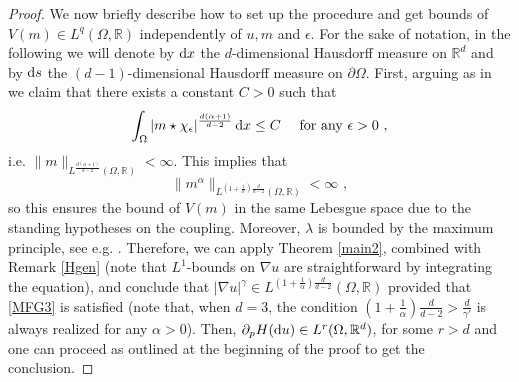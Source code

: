 \documentclass[10pt, a4paper, reqno, oneside]{amsart}
\theoremstyle{plain}
\theoremstyle{definition}
\theoremstyle{plain}
\theoremstyle{definition}
\theoremstyle{plain}
\renewcommand{\=}{:=}
\begin{document}
\begin{proof}
We now briefly describe how to set up the procedure and get bounds of $V(m)\in L^q(\Omega,\mathbb{R})$ independently of $u,m$ and $\epsilon$. For the sake of notation, in the following we will denote by ${\rm d}x$ the $d$-dimensional Hausdorff measure on $\mathbb{R}^d$ and by ${\rm d}s$ the $(d{-}1)$-dimensional Hausdorff measure on $\partial \Omega$. First, arguing as in \cite[Lemma 11]{CirantJMPA} we claim that there exists a constant $C>0$ such that
\begin{equation}\label{estsob}
\int_{\Omega}|m\star \chi_\epsilon|^{\frac{d(\alpha+1)}{d-2}}\,{\rm d}x \leq C \quad \text{ for any } \epsilon>0 \,\, ,
\end{equation}
i.e. $\|m\|_{L^{\frac{d(\alpha+1)}{d-2}}(\Omega,\mathbb{R})} < \infty$. This implies that
$$
\|m^\alpha\|_{L^{(1+\frac1\alpha)\frac{d}{d-2}}(\Omega,\mathbb{R})}<\infty \,\, ,
$$
so this ensures the bound of $V(m)$ in the same Lebesgue space due to the standing hypotheses on the coupling. Moreover, $\lambda$ is bounded by the maximum principle, see e.g. \cite[Theorem 7]{CirantJMPA}. Therefore, we can apply Theorem \ref{main2}, combined with Remark \ref{Hgen} (note that $L^1$-bounds on $\nabla u$ are straightforward by integrating the equation), and conclude that $|\nabla u|^\gamma\in L^{(1+\frac1\alpha)\frac{d}{d-2}}(\Omega,\mathbb{R})$ provided that \eqref{MFG3} is satisfied (note that, when $d=3$, the condition $(1+\frac1\alpha)\frac{d}{d-2}>\frac{d}{\gamma'}$ is always realized for any $\alpha>0$). Then, $\partial_pH({\rm d}u)\in L^r(\Omega,\mathbb{R}^d)$, for some $r>d$ and one can proceed as outlined at the beginning of the proof to get the conclusion.


\end{proof}
\end{document}
